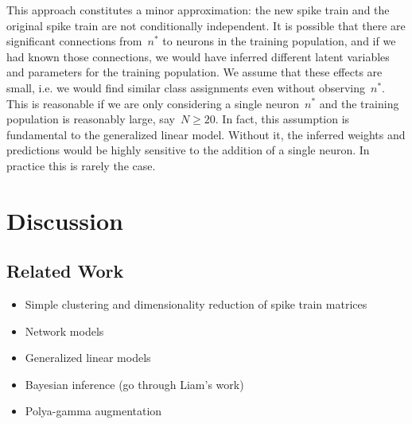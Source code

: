 This approach constitutes a minor approximation:
the new spike train and the original spike train are not
conditionally independent. It is possible that there are
significant connections from~$n^*$ to neurons in the training
population, and if we had known those connections, we would
have inferred different latent variables and parameters for
the training population. We assume that these effects are small,
i.e. we would find similar class assignments even without observing~$n^*$.
This is reasonable if we are only considering a single neuron~$n^*$
and the training population is reasonably large, say~$N \geq 20$.
In fact, this assumption is fundamental to the generalized
linear model. Without it, the inferred weights and predictions
would be highly sensitive to the addition of a single neuron.
In practice this is rarely the case.


\section{Discussion}

\subsection{Related Work}
\begin{itemize}
\item Simple clustering and dimensionality reduction of spike train matrices
\item Network models
\item Generalized linear models
\item Bayesian inference (go through Liam's work)
\item Polya-gamma augmentation
\end{itemize}
